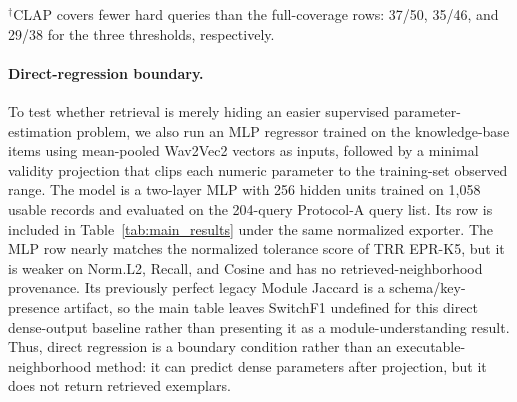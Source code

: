 \begin{table}[t]
\centering
\caption{Parameter-cluster hard-split sweep. Each cell reports mean normalized L2; bootstrap 95\% confidence intervals and coverage counts are preserved in the E9 audit artifact. Lower is better.}
\label{tab:hard_split_results}
\small
\setlength{\tabcolsep}{4pt}
\end{table}
\noindent $^\dagger$CLAP covers fewer hard queries than the full-coverage rows: 37/50, 35/46, and 29/38 for the three thresholds, respectively.

\paragraph{Direct-regression boundary.}
To test whether retrieval is merely hiding an easier supervised parameter-estimation problem, we also run an MLP regressor trained on the knowledge-base items using mean-pooled Wav2Vec2 vectors as inputs, followed by a minimal validity projection that clips each numeric parameter to the training-set observed range. The model is a two-layer MLP with 256 hidden units trained on 1,058 usable records and evaluated on the 204-query Protocol-A query list. Its row is included in Table~\ref{tab:main_results} under the same normalized exporter. The MLP row nearly matches the normalized tolerance score of TRR EPR-K5, but it is weaker on Norm.L2, Recall, and Cosine and has no retrieved-neighborhood provenance. Its previously perfect legacy Module Jaccard is a schema/key-presence artifact, so the main table leaves SwitchF1 undefined for this direct dense-output baseline rather than presenting it as a module-understanding result. Thus, direct regression is a boundary condition rather than an executable-neighborhood method: it can predict dense parameters after projection, but it does not return retrieved exemplars.


